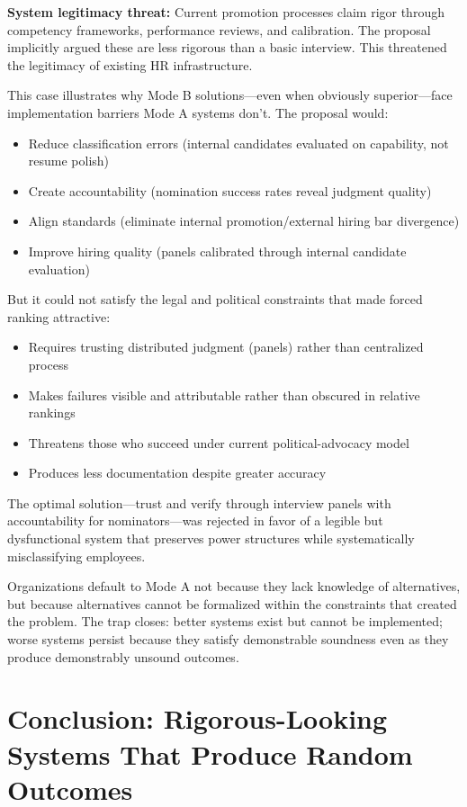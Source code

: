 \documentclass[12pt]{article}
\begin{document}
\textbf{System legitimacy threat:} Current promotion processes claim rigor through competency frameworks, performance reviews, and calibration. The proposal implicitly argued these are less rigorous than a basic interview. This threatened the legitimacy of existing HR infrastructure.

This case illustrates why Mode B solutions---even when obviously superior---face implementation barriers Mode A systems don't. The proposal would:
\begin{itemize}
\item Reduce classification errors (internal candidates evaluated on capability, not resume polish)
\item Create accountability (nomination success rates reveal judgment quality)
\item Align standards (eliminate internal promotion/external hiring bar divergence)
\item Improve hiring quality (panels calibrated through internal candidate evaluation)
\end{itemize}

But it could not satisfy the legal and political constraints that made forced ranking attractive:
\begin{itemize}
\item Requires trusting distributed judgment (panels) rather than centralized process
\item Makes failures visible and attributable rather than obscured in relative rankings
\item Threatens those who succeed under current political-advocacy model
\item Produces less documentation despite greater accuracy
\end{itemize}

The optimal solution---trust and verify through interview panels with accountability for nominators---was rejected in favor of a legible but dysfunctional system that preserves power structures while systematically misclassifying employees.

Organizations default to Mode A not because they lack knowledge of alternatives, but because alternatives cannot be formalized within the constraints that created the problem. The trap closes: better systems exist but cannot be implemented; worse systems persist because they satisfy demonstrable soundness even as they produce demonstrably unsound outcomes.

\section{Conclusion: Rigorous-Looking Systems That Produce Random Outcomes}
\end{document}
